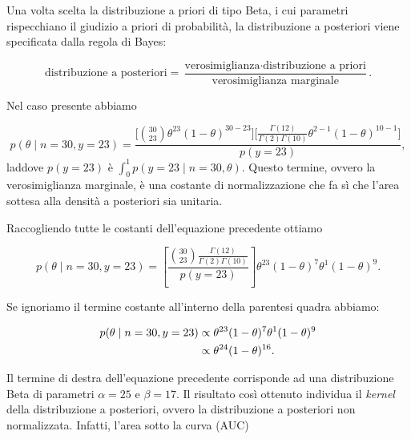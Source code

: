 \documentclass[
]{memoir}
\newenvironment{Shaded}{\begin{snugshade}}{\end{snugshade}}
\newcommand{\AttributeTok}[1]{\textcolor[rgb]{0.77,0.63,0.00}{#1}}
\newcommand{\CommentTok}[1]{\textcolor[rgb]{0.56,0.35,0.01}{\textit{#1}}}
\newcommand{\ControlFlowTok}[1]{\textcolor[rgb]{0.13,0.29,0.53}{\textbf{#1}}}
\newcommand{\DecValTok}[1]{\textcolor[rgb]{0.00,0.00,0.81}{#1}}
\newcommand{\FunctionTok}[1]{\textcolor[rgb]{0.00,0.00,0.00}{#1}}
\newcommand{\NormalTok}[1]{#1}
\newcommand{\OtherTok}[1]{\textcolor[rgb]{0.56,0.35,0.01}{#1}}
\newcommand{\SpecialCharTok}[1]{\textcolor[rgb]{0.00,0.00,0.00}{#1}}
\theoremstyle{definition}
\theoremstyle{definition}
\theoremstyle{definition}
\theoremstyle{definition}
\theoremstyle{remark}
\begin{document}
Una volta scelta la distribuzione a priori di tipo Beta, i cui parametri rispecchiano il giudizio a priori di probabilità, la distribuzione a posteriori viene specificata dalla regola di Bayes:

\[
\text{distribuzione a posteriori} = \frac{\text{verosimiglianza}\cdot\text{distribuzione a priori}}{\text{verosimiglianza marginale}}.
\]

Nel caso presente abbiamo

\[
p(\theta \mid n=30, y=23) = \frac{\Big[\binom{30}{23}\theta^{23}(1-\theta)^{30-23}\Big]\Big[\frac{\Gamma(12)}{\Gamma(2)\Gamma(10)}\theta^{2-1} (1-\theta)^{10-1}\Big]}{p(y = 23)},
\]
\noindent
laddove \(p(y = 23)\) è \(\int_0^1p(y = 23 \mid n = 30, \theta)\). Questo termine, ovvero la verosimiglianza marginale, è una costante di normalizzazione che fa sì che l'area sottesa alla densità a posteriori sia unitaria.

Raccogliendo tutte le costanti dell'equazione precedente ottiamo

\[
p(\theta \mid n=30, y=23) =\left[\frac{\binom{30}{23}\frac{\Gamma(12)}{\Gamma(2)\Gamma(10)}}{p(y = 23)}\right] \theta^{23}(1-\theta)^{7}\theta^{1} (1-\theta)^{9}.
\]

Se ignoriamo il termine costante all'interno della parentesi quadra abbiamo:

\begin{align}
p(\theta \mid n=30, y=23) &\propto \theta^{23}(1-\theta)^{7}\theta^{1} (1-\theta)^{9}\notag\\
&\propto \theta^{24}(1-\theta)^{16}.\notag
\end{align}

Il termine di destra dell'equazione precedente corrisponde ad una distribuzione Beta di parametri \(\alpha=25\) e \(\beta = 17\). Il risultato così ottenuto individua il \emph{kernel} della distribuzione a posteriori, ovvero la distribuzione a posteriori non normalizzata. Infatti, l'area sotto la curva (AUC)

\begin{Shaded}
\end{Shaded}
\end{document}
